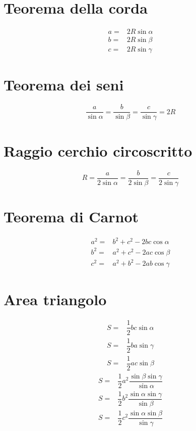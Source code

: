 \section{Teorema della corda}
\begin{align}
a=&2R\sin\alpha\\
b=&2R\sin\beta\\
c=&2R\sin\gamma
\end{align}
\section{Teorema dei seni}
\begin{equation}
\dfrac{a}{\sin\alpha}=\dfrac{b}{\sin\beta}=\dfrac{c}{\sin\gamma}=2R
\end{equation}
\section{Raggio cerchio circoscritto}
\begin{equation}
R=\dfrac{a}{2\sin\alpha}=\dfrac{b}{2\sin\beta}=\dfrac{c}{2\sin\gamma}
\end{equation}
\section{Teorema di Carnot}
\begin{align}
a^2=&b^2+c^2-2bc\cos\alpha\\
b^2=&a^2+c^2-2ac\cos\beta\\
c^2=&a^2+b^2-2ab\cos\gamma
\end{align}
\section{Area triangolo}
\begin{align}
S=&\dfrac{1}{2}bc\sin\alpha\\
S=&\dfrac{1}{2}ba\sin\gamma\\
S=&\dfrac{1}{2}ac\sin\beta
\end{align}
\begin{align}
S=&\dfrac{1}{2}a^2\dfrac{\sin\beta\sin\gamma}{\sin\alpha}\\
S=&\dfrac{1}{2}b^2\dfrac{\sin\alpha\sin\gamma}{\sin\beta}\\
S=&\dfrac{1}{2}c^2\dfrac{\sin\alpha\sin\beta}{\sin\gamma}
\end{align}